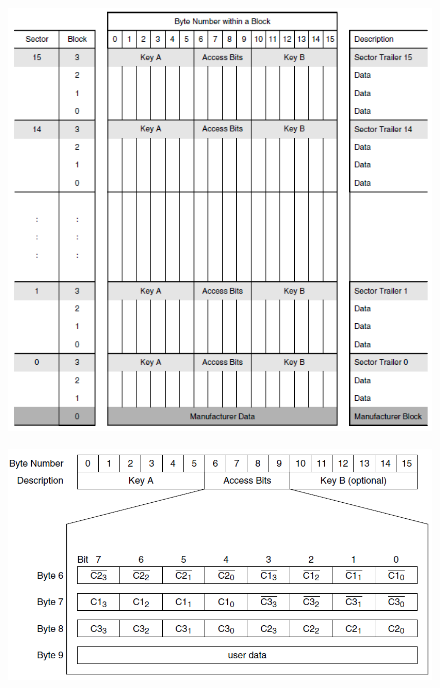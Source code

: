 \documentclass[fleqn,10pt]{SelfArx} %
\begin{document}
\begin{figure}[h]
\centering
\begin{minipage}[b]{.47\textwidth}
  \centering
  \includegraphics[width=\textwidth]{img/mem1k}
  \label{fig:mem1k}
\end{minipage}
\begin{minipage}[b]{.47\textwidth}
  \centering
  \includegraphics[width=\textwidth]{img/access}
  \label{fig:access}
\end{minipage}
\end{figure}
\end{document}
